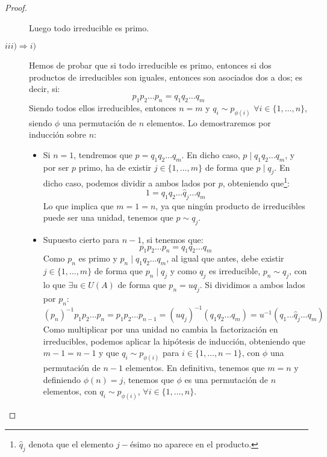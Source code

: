 \begin{teo}
\begin{proof}
\begin{description}
            Luego todo irreducible es primo.
        \item [$iii) \Longrightarrow i)$] Hemos de probar que si todo irreducible es primo, entonces si dos productos de irreducibles son iguales, entonces son asociados dos a dos; es decir, si:
            \begin{equation*}
                p_1p_2\ldots p_n = q_1q_2 \ldots q_m 
            \end{equation*}
            Siendo todos ellos irreducibles, entonces $n = m$ y $q_i \sim p_{\phi(i)}$ $\forall i \in \{1,\ldots,n\}$, siendo $\phi$ una permutación de $n$ elementos. Lo demostraremos por inducción sobre $n$:
            \begin{itemize}
                \item Si $n = 1$, tendremos que $p = q_1q_2 \ldots q_m$. En dicho caso, $p \mid q_1q_2 \ldots q_m$, y por ser $p$ primo, ha de existir $j \in \{1,\ldots,m\}$ de forma que $p \mid q_j$. En dicho caso, podemos dividir a ambos lados por $p$, obteniendo que\footnote{$\hat{q}_j$ denota que el elemento $j-$ésimo no aparece en el producto.}:
                    \begin{equation*}
                        1 = q_1q_2 \ldots \hat{q}_j \ldots q_m
                    \end{equation*}
                    Lo que implica que $m = 1 = n$, ya que ningún producto de irreducibles puede ser una unidad, tenemos que $p \sim q_j$.
                \item Supuesto cierto para $n-1$, si tenemos que:
                \begin{equation*}
                    p_1p_2\ldots p_n = q_1q_2 \ldots q_m 
                \end{equation*}
                Como $p_n$ es primo y $p_n \mid q_1q_2 \ldots q_m$, al igual que antes, debe existir $j \in \{1,\ldots,m\}$ de forma que $p_n \mid q_j$ y como $q_j$ es irreducible, $p_n \sim q_j$, con lo que $\exists u\in U(A)$ de forma que $p_n = uq_j$. Si dividimos a ambos lados por $p_n$:
                \begin{equation*}
                    {(p_n)}^{-1}p_1p_2 \ldots p_n = p_1p_2\ldots p_{n-1} = {(uq_j)}^{-1} (q_1 q_2 \ldots q_m) = u^{-1}(q_1 \ldots \hat{q}_j \ldots q_m)
                \end{equation*}
                Como multiplicar por una unidad no cambia la factorización en irreducibles, podemos aplicar la hipótesis de inducción, obteniendo que $m-1 = n-1$ y que $q_i \sim p_{\phi(i)}$ para $i \in \{1,\ldots,n-1\}$, con $\phi$ una permutación de $n-1$ elementos. En definitiva, tenemos que $m = n$ y definiendo $\phi(n) = j$, tenemos que $\phi$ es una permutación de $n$ elementos, con $q_i \sim p_{\phi(i)}$, $\forall i \in \{1,\ldots,n\}$.
            \end{itemize}
    \end{description}
\end{proof}
\end{teo}

